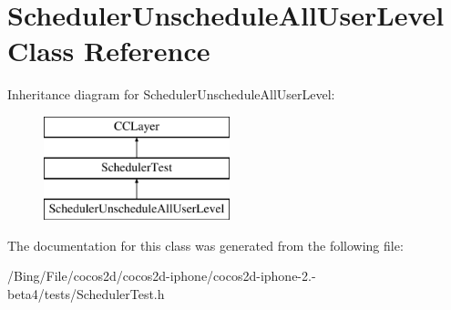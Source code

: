 \hypertarget{interface_scheduler_unschedule_all_user_level}{\section{Scheduler\-Unschedule\-All\-User\-Level Class Reference}
\label{interface_scheduler_unschedule_all_user_level}
}
Inheritance diagram for Scheduler\-Unschedule\-All\-User\-Level\-:\begin{figure}[H]
\begin{center}
\leavevmode
\includegraphics[height=3.000000cm]{interface_scheduler_unschedule_all_user_level}
\end{center}
\end{figure}


The documentation for this class was generated from the following file\-:\begin{DoxyCompactItemize}
\item 
/\-Bing/\-File/cocos2d/cocos2d-\/iphone/cocos2d-\/iphone-\/2.-\/beta4/tests/Scheduler\-Test.\-h\end{DoxyCompactItemize}
